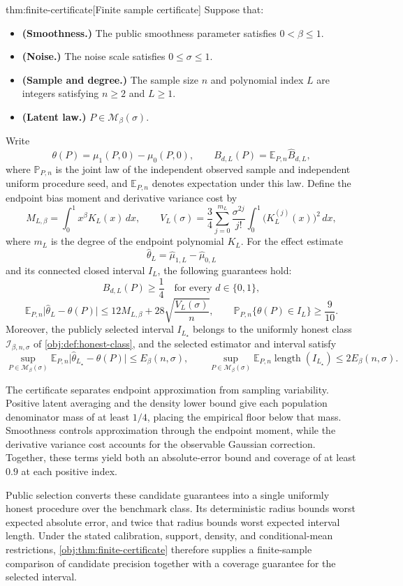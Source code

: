 \begin{theoremv}{thm:finite-certificate}[Finite sample certificate]
Suppose that:
\begin{itemize}
\item \textbf{(Smoothness.)} The public smoothness parameter satisfies \(0<\beta\le1\).
\item \textbf{(Noise.)} The noise scale satisfies \(0\le\sigma\le1\).
\item \textbf{(Sample and degree.)} The sample size \(n\) and polynomial index \(L\) are integers satisfying \(n\ge2\) and \(L\ge1\).
\item \textbf{(Latent law.)} \(P\in\mathcal M_\beta(\sigma)\).
\end{itemize}
Write
\[
\theta(P)=\mu_1(P,0)-\mu_0(P,0),
\qquad
B_{d,L}(P)=\mathbb E_{P,n}\widehat B_{d,L},
\]
where \(\mathbb P_{P,n}\) is the joint law of the independent observed sample and independent uniform procedure seed, and \(\mathbb E_{P,n}\) denotes expectation under this law. Define the endpoint bias moment and derivative variance cost by
\[
M_{L,\beta}
=\int_0^1 x^\beta K_L(x)\,dx,
\qquad
V_L(\sigma)
=\frac34\sum_{j=0}^{m_L}
\frac{\sigma^{2j}}{j!}
\int_0^1\bigl(K_L^{(j)}(x)\bigr)^2\,dx,
\]
where \(m_L\) is the degree of the endpoint polynomial \(K_L\).
For the effect estimate
\[
\widehat\theta_L=\widehat\mu_{1,L}-\widehat\mu_{0,L}
\]
and its connected closed interval \(I_L\), the following guarantees hold:
\[
B_{d,L}(P)\ge\frac14
\quad\text{for every }d\in\{0,1\},
\]
\[
\mathbb E_{P,n}\bigl|\widehat\theta_L-\theta(P)\bigr|
\le
12M_{L,\beta}
+28\sqrt{\frac{V_L(\sigma)}{n}},
\qquad
\mathbb P_{P,n}\{\theta(P)\in I_L\}\ge\frac9{10}.
\]
Moreover, the publicly selected interval \(I_{L_\star}\) belongs to the uniformly honest class \(\mathcal I_{\beta,n,\sigma}\) of \cref{obj:def:honest-class}, and the selected estimator and interval satisfy
\[
\sup_{P\in\mathcal M_\beta(\sigma)}
\mathbb E_{P,n}
\bigl|\widehat\theta_{L_\star}-\theta(P)\bigr|
\le E_\beta(n,\sigma),
\qquad
\sup_{P\in\mathcal M_\beta(\sigma)}
\mathbb E_{P,n}\operatorname{length}(I_{L_\star})
\le2E_\beta(n,\sigma).
\]
\end{theoremv}

The certificate separates endpoint approximation from sampling variability. Positive latent averaging and the density lower bound give each population denominator mass of at least \(1/4\), placing the empirical floor below that mass. Smoothness controls approximation through the endpoint moment, while the derivative variance cost accounts for the observable Gaussian correction. Together, these terms yield both an absolute-error bound and coverage of at least \(0.9\) at each positive index.

Public selection converts these candidate guarantees into a single uniformly honest procedure over the benchmark class. Its deterministic radius bounds worst expected absolute error, and twice that radius bounds worst expected interval length. Under the stated calibration, support, density, and conditional-mean restrictions, \cref{obj:thm:finite-certificate} therefore supplies a finite-sample comparison of candidate precision together with a coverage guarantee for the selected interval.
